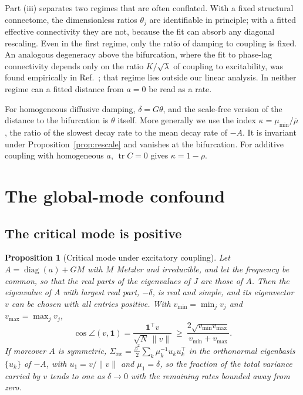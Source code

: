 \documentclass[aip,cha,reprint,amsmath,amssymb]{revtex4-2}
\newtheorem{proposition}{Proposition}
\theoremstyle{remark}
\newcommand{\one}{\mathbf 1}
\newcommand{\diag}{\operatorname{diag}}
\begin{document}
Part (iii) separates two regimes that are often conflated. With a fixed structural connectome, the dimensionless ratios $\theta_j$ are identifiable in principle; with a fitted effective connectivity they are not, because the fit can absorb any diagonal rescaling. Even in the first regime, only the ratio of damping to coupling is fixed. An analogous degeneracy above the bifurcation, where the fit to phase-lag connectivity depends only on the ratio $K/\sqrt\lambda$ of coupling to excitability, was found empirically in Ref.~; that regime lies outside our linear analysis. In neither regime can a fitted distance from $a=0$ be read as a rate.

For homogeneous diffusive damping, $\delta=G\theta$, and the scale-free version of the distance to the bifurcation is $\theta$ itself. More generally we use the index $\kappa=\mu_{\min}/\bar\mu$, the ratio of the slowest decay rate to the mean decay rate of $-A$. It is invariant under Proposition~\ref{prop:rescale} and vanishes at the bifurcation. For additive coupling with homogeneous $a$, $\operatorname{tr}C=0$ gives $\kappa=1-\rho$.

\section{The global-mode confound}\label{sec:confound}

\subsection{The critical mode is positive}

\begin{proposition}[Critical mode under excitatory coupling]\label{prop:perron}
Let $A=\diag(a)+GM$ with $M$ Metzler and irreducible, and let the frequency be common, so that the real parts of the eigenvalues of $J$ are those of $A$. Then the eigenvalue of $A$ with largest real part, $-\delta$, is real and simple, and its eigenvector $v$ can be chosen with all entries positive. With $v_{\min}=\min_jv_j$ and $v_{\max}=\max_jv_j$,
\begin{equation}\label{eq:polya}
  \cos\angle(v,\one)=\frac{\one^\top v}{\sqrt N\,\|v\|}\ \ge\ \frac{2\sqrt{v_{\min}v_{\max}}}{v_{\min}+v_{\max}}.
\end{equation}
If moreover $A$ is symmetric, $\Sigma_{xx}=\tfrac{\beta^2}{2}\sum_k\mu_k^{-1}u_ku_k^\top$ in the orthonormal eigenbasis $\{u_k\}$ of $-A$, with $u_1=v/\|v\|$ and $\mu_1=\delta$, so the fraction of the total variance carried by $v$ tends to one as $\delta\to0$ with the remaining rates bounded away from zero.
\end{proposition}
\end{document}
